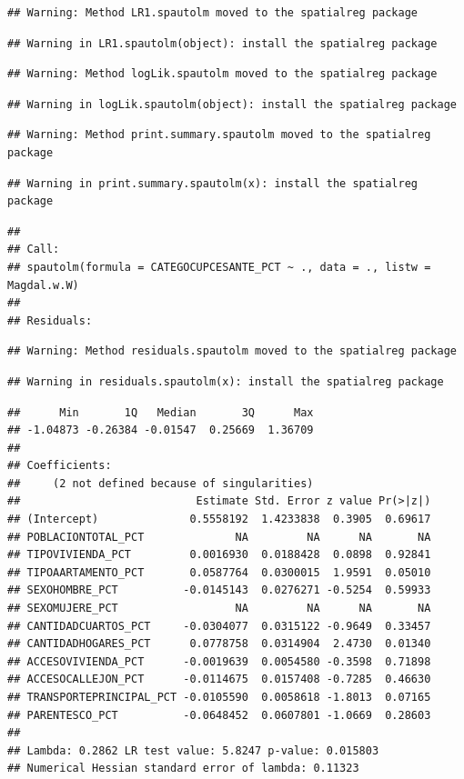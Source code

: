 \documentclass[11pt,]{article}
\begin{document}
\begin{verbatim}
## Warning: Method LR1.spautolm moved to the spatialreg package
\end{verbatim}

\begin{verbatim}
## Warning in LR1.spautolm(object): install the spatialreg package
\end{verbatim}

\begin{verbatim}
## Warning: Method logLik.spautolm moved to the spatialreg package
\end{verbatim}

\begin{verbatim}
## Warning in logLik.spautolm(object): install the spatialreg package
\end{verbatim}

\begin{verbatim}
## Warning: Method print.summary.spautolm moved to the spatialreg package
\end{verbatim}

\begin{verbatim}
## Warning in print.summary.spautolm(x): install the spatialreg package
\end{verbatim}

\begin{verbatim}
## 
## Call: 
## spautolm(formula = CATEGOCUPCESANTE_PCT ~ ., data = ., listw = Magdal.w.W)
## 
## Residuals:
\end{verbatim}

\begin{verbatim}
## Warning: Method residuals.spautolm moved to the spatialreg package
\end{verbatim}

\begin{verbatim}
## Warning in residuals.spautolm(x): install the spatialreg package
\end{verbatim}

\begin{verbatim}
##      Min       1Q   Median       3Q      Max 
## -1.04873 -0.26384 -0.01547  0.25669  1.36709 
## 
## Coefficients: 
##     (2 not defined because of singularities)
##                           Estimate Std. Error z value Pr(>|z|)
## (Intercept)              0.5558192  1.4233838  0.3905  0.69617
## POBLACIONTOTAL_PCT              NA         NA      NA       NA
## TIPOVIVIENDA_PCT         0.0016930  0.0188428  0.0898  0.92841
## TIPOAARTAMENTO_PCT       0.0587764  0.0300015  1.9591  0.05010
## SEXOHOMBRE_PCT          -0.0145143  0.0276271 -0.5254  0.59933
## SEXOMUJERE_PCT                  NA         NA      NA       NA
## CANTIDADCUARTOS_PCT     -0.0304077  0.0315122 -0.9649  0.33457
## CANTIDADHOGARES_PCT      0.0778758  0.0314904  2.4730  0.01340
## ACCESOVIVIENDA_PCT      -0.0019639  0.0054580 -0.3598  0.71898
## ACCESOCALLEJON_PCT      -0.0114675  0.0157408 -0.7285  0.46630
## TRANSPORTEPRINCIPAL_PCT -0.0105590  0.0058618 -1.8013  0.07165
## PARENTESCO_PCT          -0.0648452  0.0607801 -1.0669  0.28603
## 
## Lambda: 0.2862 LR test value: 5.8247 p-value: 0.015803 
## Numerical Hessian standard error of lambda: 0.11323
\end{verbatim}
\end{document}
